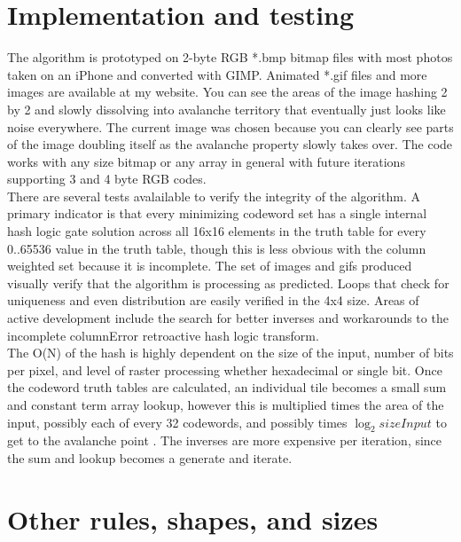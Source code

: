 \documentclass[11pt]{article}
\begin{document}
\section{Implementation and testing}

The algorithm is prototyped on 2-byte RGB *.bmp bitmap files with most photos taken on an iPhone and converted with GIMP. Animated *.gif files and more images are available at my website. You can see the areas of the image hashing 2 by 2 and slowly dissolving into avalanche territory that eventually just looks like noise everywhere. The current image was chosen because you can clearly see parts of the image doubling itself as the avalanche property slowly takes over. The code works with any size bitmap or any array in general with future iterations supporting 3 and 4 byte RGB codes. \\

There are several tests avalailable to verify the integrity of the algorithm. A primary indicator is that every minimizing codeword set has a single internal hash logic gate solution across all 16x16 elements in the truth table for every 0..65536 value in the truth table, though this is less obvious with the column weighted set because it is incomplete. The set of images and gifs produced visually verify that the algorithm is processing as predicted. Loops that check for uniqueness and even distribution are easily verified in the 4x4 size. Areas of active development include the search for better inverses and workarounds to the incomplete columnError retroactive hash logic transform.\\

The O(N) of the hash is highly dependent on the size of the input, number of bits per pixel, and level of raster processing whether hexadecimal or single bit. Once the codeword truth tables are calculated, an individual tile becomes a small sum and constant term array lookup, however this is multiplied times the area of the input, possibly each of every 32 codewords, and possibly times $\log_2 sizeInput$ to get to the avalanche point . The inverses are more expensive per iteration, since the sum and lookup becomes a generate and iterate.\\

\section{Other rules, shapes, and sizes}
\end{document}
